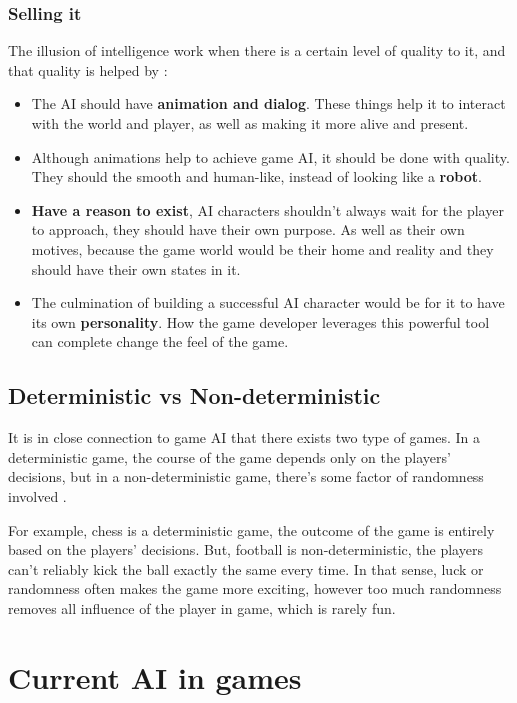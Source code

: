 \documentclass[a4paper, 12pt]{book}
\begin{document}
\subsection{Selling it}
The illusion of intelligence work when there is a certain level of quality to it, and that quality is helped by \cite{IllusionOfIntelligece}:
\begin{itemize}
    \item The AI should have \textbf{animation and dialog}. These things help it to interact with the world and player, as well as making it more alive and present.
    \item Although animations help to achieve game AI, it should be done with quality. They should the smooth and human-like, instead of looking like a \textbf{robot}.
    \item \textbf{Have a reason to exist}, AI characters shouldn't always wait for the player to approach, they should have their own purpose. As well as their own motives, because the game world would be their home and reality and they should have their own states in it.
    \item The culmination of building a successful AI character would be for it to have its own \textbf{personality}. How the game developer leverages this powerful tool can complete change the feel of the game.
\end{itemize}


\section{Deterministic vs Non-deterministic}
It is in close connection to game AI that there exists two type of games. In a deterministic game, the course of the game depends only on the players’ decisions, but in a non-deterministic game, there’s some factor of randomness involved \cite{DeepLearningGO}.

For example, chess is a deterministic game, the outcome of the game is entirely based on the players' decisions. But, football is non-deterministic, the players can't reliably kick the ball exactly the same every time. In that sense, luck or randomness often makes the game more exciting, however too much randomness removes all influence of the player in game, which is rarely fun.


\chapter{Current AI in games}
\label{ch2}
\end{document}
